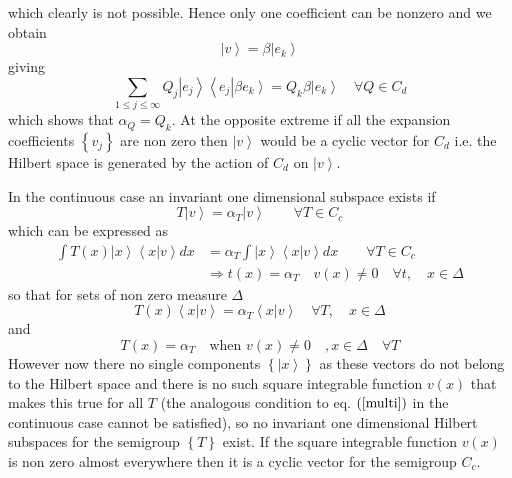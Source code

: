 \documentclass[aps,preprint]{revtex4}%
\begin{document}
which clearly is not possible. Hence only one coefficient can be nonzero and
we obtain%
\begin{equation}
\left\vert v\right\rangle =\beta\left\vert e_{k}\right\rangle
\end{equation}
giving
\begin{equation}%
{\displaystyle\sum\limits_{1\leq j\leq\infty}}
Q_{j}\left\vert e_{j}\right\rangle \left\langle e_{j}\right\vert \beta\left.
e_{k}\right\rangle =Q_{k}\beta\left\vert e_{k}\right\rangle \quad\forall Q\in
C_{d}%
\end{equation}
which shows that $\alpha_{Q}=Q_{k}$. At the opposite extreme if all the
expansion coefficients $\left\{  v_{j}\right\}  $ are non zero then
$\left\vert v\right\rangle $ would be a cyclic vector for $C_{d}$ i.e. the
Hilbert space is generated by the action of $C_{d}$ on $\left\vert
v\right\rangle $.

In the continuous case an invariant one dimensional subspace exists if
\begin{equation}
T\left\vert v\right\rangle =\alpha_{T}\left\vert v\right\rangle \qquad\forall
T\in C_{c}%
\end{equation}
which can be expressed as
\begin{align}%
{\displaystyle\int}
T\left(  x\right)  \left\vert x\right\rangle \left\langle x\right\vert \left.
v\right\rangle dx  &  =\alpha_{T}%
{\displaystyle\int}
\left\vert x\right\rangle \left\langle x\right\vert \left.  v\right\rangle
dx\qquad\forall T\in C_{c}\\
&  \Rightarrow t\left(  x\right)  =\alpha_{T}\quad v\left(  x\right)
\neq0\quad\forall t,\quad x\in\Delta
\end{align}
so that for sets of non zero measure $\Delta$
\begin{equation}
T\left(  x\right)  \left\langle x\right\vert \left.  v\right\rangle
=\alpha_{T}\left\langle x\right\vert \left.  v\right\rangle \quad\forall
T,\quad x\in\Delta
\end{equation}
and
\begin{equation}
T\left(  x\right)  =\alpha_{T}\quad\text{when }v\left(  x\right)  \neq
0\quad,x\in\Delta\quad\forall T
\end{equation}
However now there no single components $\left\{  \left\vert x\right\rangle
\right\}  $ as these vectors do not belong to the Hilbert space and there is
no such square integrable function $v\left(  x\right)  $ that makes this true
for all $T$ (the analogous condition to eq. $\left(  \ref{multi}\right)  $ in
the continuous case cannot be satisfied), so no invariant one dimensional
Hilbert subspaces for the semigroup $\left\{  T\right\}  $ exist. If the
square integrable function $v\left(  x\right)  $ is non zero almost everywhere
then it is a cyclic vector for the semigroup $C_{c}.$
\end{document}
